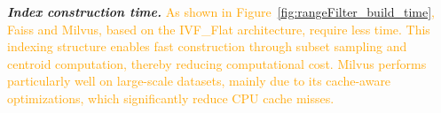 \documentclass[sigconf, nonacm]{acmart}
\begin{document}
{	\textit{\textbf{Index construction time.}}
%
%	
	\textcolor{orange}{
	As shown in Figure~\ref{fig:rangeFilter_build_time}, Faiss and Milvus, based on the IVF\_Flat architecture, require less time. This indexing structure enables fast construction through subset sampling and centroid computation, thereby reducing computational cost. Milvus performs particularly well on large-scale datasets, mainly due to its cache-aware optimizations, which significantly reduce CPU cache misses.}

}
\end{document}
